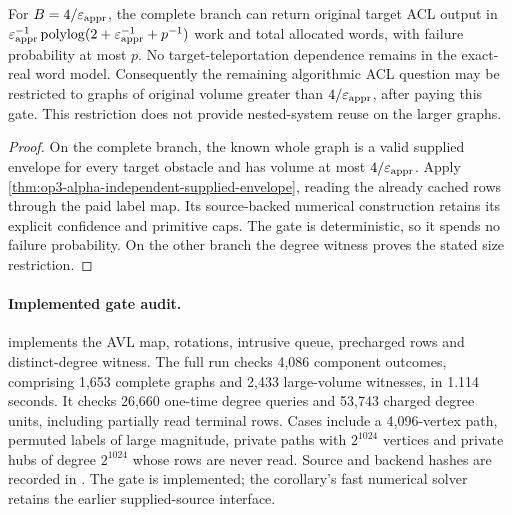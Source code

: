 \begin{corollary}
\label{cor:op3-small-whole-graph}
For $B=4/\varepsilon_{\mathrm{appr}}$, the complete branch can return original target
ACL output in
$\varepsilon_{\mathrm{appr}}^{-1}\operatorname{polylog}(2+\varepsilon_{\mathrm{appr}}^{-1}+p^{-1})$
work and total allocated words, with failure probability at most $p$.
No target-teleportation dependence remains in the exact-real word model.
Consequently the remaining algorithmic ACL question may be restricted
to graphs of original volume greater than $4/\varepsilon_{\mathrm{appr}}$, after paying
this gate. This restriction does not provide nested-system reuse on
the larger graphs.
\end{corollary}
\begin{proof}
On the complete branch, the known whole graph is a valid supplied
envelope for every target obstacle and has volume at most $4/\varepsilon_{\mathrm{appr}}$.
Apply \cref{thm:op3-alpha-independent-supplied-envelope}, reading
the already cached rows through the paid label map. Its source-backed
numerical construction retains its explicit confidence and primitive
caps. The gate is deterministic, so it spends no failure probability.
On the other branch the degree witness proves the stated size restriction.
\end{proof}

\paragraph{Implemented gate audit.}
 implements the AVL map, rotations,
intrusive queue, precharged rows and distinct-degree witness. The full
run checks 4,086 component outcomes, comprising 1,653 complete graphs
and 2,433 large-volume witnesses, in 1.114 seconds. It checks 26,660
one-time degree queries and 53,743 charged degree units, including
partially read terminal rows. Cases include a 4,096-vertex path,
permuted labels of large magnitude, private paths with $2^{1024}$
vertices and private hubs of degree $2^{1024}$ whose rows are never
read. Source and backend hashes are recorded in
.
The gate is implemented; the corollary's fast numerical solver retains
the earlier supplied-source interface.
